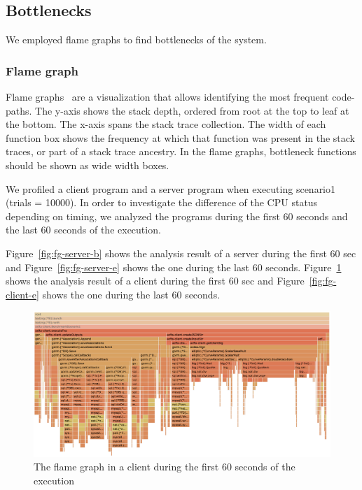 \documentclass[a4paper, oneside]{discothesis}
\begin{document}
\begin{table}[t]
\begin{center}
\begin{tabular}{c}
        \end{tabular}
    \end{center}
\end{table}


\subsection{Bottlenecks}
We employed flame graphs to find bottlenecks of the system.

\subsubsection{Flame graph}
Flame graphs~\cite{flame} are a visualization that allows identifying
the most frequent code-paths.
The y-axis shows the stack depth, ordered from root at the top to leaf at the bottom.
The x-axis spans the stack trace collection.
The width of each function box shows the frequency at which that function was present
in the stack traces, or part of a stack trace ancestry.
In the flame graphs, bottleneck functions should be shown as wide width boxes.

We profiled a client program and a server program when executing scenario1 (trials = 10000).
In order to investigate the difference of the CPU status depending on timing,
we analyzed the programs during the first 60 seconds and the last 60 seconds of the execution.

Figure~\ref{fig:fg-server-b} shows the analysis result of a server during the first 60 sec and
Figure~\ref{fig:fg-server-e} shows the one during the last 60 seconds.
Figure~\ref{fig:fg-client-b} shows the analysis result of a client during the first 60 sec and
Figure~\ref{fig:fg-client-e} shows the one during the last 60 seconds.

\begin{figure}[p]
    \begin{center}
        \includegraphics[width=\columnwidth]{figures/flame_graph_client_begining}
        \caption{The flame graph in a client during the first 60 seconds of the execution}
        \label{fig:fg-client-b}
    \end{center}
\end{figure}
\end{document}
